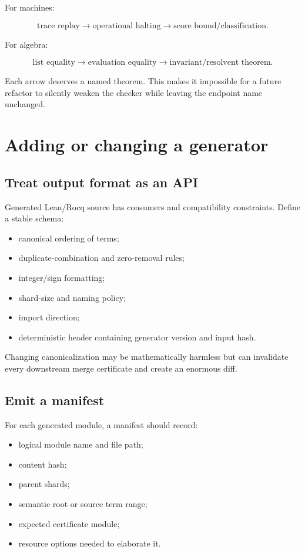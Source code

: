 \documentclass[
  10pt,
  a4paper,
  twoside,
  open=any,
  parskip=half,
  headings=big
]{scrreprt}
\begin{document}
For machines:

\[
\text{trace replay}
\to \text{operational halting}
\to \text{score bound/classification}.
\]

For algebra:

\[
\text{list equality}
\to \text{evaluation equality}
\to \text{invariant/resolvent theorem}.
\]

Each arrow deserves a named theorem.  This makes it impossible for a future
refactor to silently weaken the checker while leaving the endpoint name
unchanged.

\section{Adding or changing a generator}

\subsection{Treat output format as an API}

Generated Lean/Rocq source has consumers and compatibility constraints.  Define
a stable schema:

\begin{itemize}
  \item canonical ordering of terms;
  \item duplicate-combination and zero-removal rules;
  \item integer/sign formatting;
  \item shard-size and naming policy;
  \item import direction;
  \item deterministic header containing generator version and input hash.
\end{itemize}

Changing canonicalization may be mathematically harmless but can invalidate
every downstream merge certificate and create an enormous diff.

\subsection{Emit a manifest}

For each generated module, a manifest should record:

\begin{itemize}
  \item logical module name and file path;
  \item content hash;
  \item parent shards;
  \item semantic root or source term range;
  \item expected certificate module;
  \item resource options needed to elaborate it.
\end{itemize}
\end{document}
